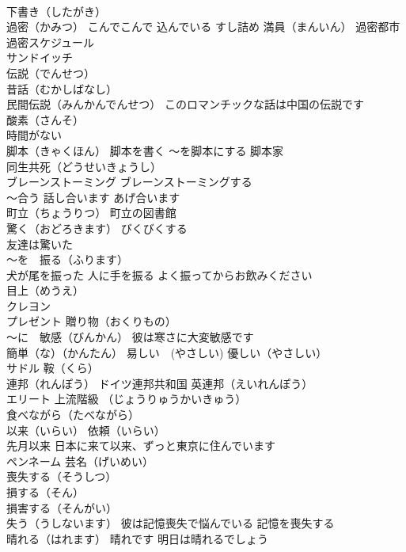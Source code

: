 \documentclass[8pt]{extreport}
\begin{document}
\begin{CJK}{UTF8}{min}
\\	下書き（したがき）
\\	過密（かみつ） こんでこんで 込んでいる すし詰め 満員（まんいん） 過密都市 過密スケジュール
\\	サンドイッチ
\\	伝説（でんせつ）　
\\	昔話（むかしばなし）　
\\	民間伝説（みんかんでんせつ） このロマンチックな話は中国の伝説です
\\	酸素（さんそ）
\\	時間がない
\\	脚本（きゃくほん） 脚本を書く ～を脚本にする 脚本家
\\	同生共死（どうせいきょうし）
\\	ブレーンストーミング ブレーンストーミングする
\\	～合う 話し合います あげ合います
\\	町立（ちょうりつ） 町立の図書館
\\	驚く（おどろきます） びくびくする 
\\	友達は驚いた
\\	～を　振る（ふります） 
\\	犬が尾を振った 人に手を振る よく振ってからお飲みください
\\	目上（めうえ）
\\	クレヨン
\\	プレゼント 贈り物（おくりもの）
\\	～に　敏感（びんかん） 彼は寒さに大変敏感です
\\	簡単（な）（かんたん） 易しい　(やさしい) 優しい（やさしい）
\\	サドル 鞍（くら）
\\	連邦（れんぽう） ドイツ連邦共和国 英連邦（えいれんぽう）
\\	エリート 上流階級 （じょうりゅうかいきゅう）
\\	食べながら（たべながら）
\\	以来（いらい） 依頼（いらい）
\\	先月以来 日本に来て以来、ずっと東京に住んでいます
\\	ペンネーム 芸名（げいめい）
\\	喪失する（そうしつ） 
\\	損する（そん） 
\\	損害する（そんがい） 
\\	失う（うしないます） 彼は記憶喪失で悩んでいる 記憶を喪失する
\\	晴れる（はれます） 晴れです 明日は晴れるでしょう

\end{CJK}
\end{document}

